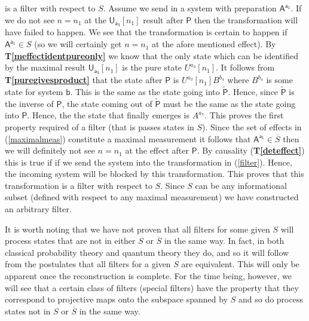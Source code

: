 \documentclass[10pt]{article}
\begin{document}
is a filter with respect to  $S$. Assume we send in a system with preparation $\mathsf{ A^{a_1}}$.  If we do not see $n=n_1$ at the $\mathsf{U_{a_3}}[n_1]$ result after $\mathsf P$ then the transformation will have failed to happen.  We see that the transformation is certain to happen if $\mathsf{ A^{a_1}\in }S$  (so we will certainly get $n=n_1$ at the afore mentioned effect).  By {\bf T\ref{meffectidentpureonly}} we know that the only state which can be identified by the maximal result $\mathsf{U_{a_3}}[n_1]$ is the pure state $U^{a_3}[n_1]$. It follows from {\bf T\ref{puregivesproduct}} that the state after $\mathsf P$ is $U^{a_3}[n_1] B^{b_4}$ where $B^{b_4}$ is some state for system $\mathsf b$.  This is the same as the state going into $\mathsf{\tilde P}$.  Hence, since $\mathsf{\tilde P}$ is the inverse of $\mathsf P$, the state coming out of $\mathsf{\tilde P}$  must be the same as the state going into $\mathsf P$.  Hence, the the state that finally emerges is $A^{a_7}$.  This proves the first property required of a filter (that is passes states in $S$).  Since the set of effects in (\ref{maximalmeas}) constitute a maximal measurement it follows that $\mathsf{ A^{a_1}}\in \overline S$ then we will definitely not see $n=n_1$ at the effect after $\mathsf P$. By causality ({\bf T\ref{deteffect}}) this is true if if we send the system into the transformation in (\ref{filter}).  Hence, the incoming system will be blocked by this transformation.  This proves that this transformation is a filter with respect to $S$.  Since $S$ can be any informational subset (defined with respect to any maximal measurement) we have constructed an arbitrary filter.

It is worth noting that we have not proven that all filters for some given $S$ will process states that are not in either $S$ or $\overline S$ in the same way.  In fact, in both classical probability theory and quantum theory they do, and so it will follow from the postulates that all filters for a given $S$ are equivalent. This will only be apparent once the reconstruction is complete.  For the time being, however, we will see that a certain class of filters (special filters) have the property that they correspond to projective maps onto the subspace spanned by $S$ and so do process states not in $S$ or $\overline S$ in the same way.
\end{document}
